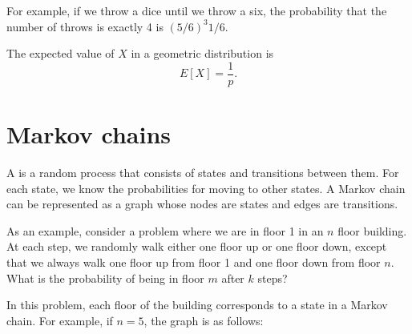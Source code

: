 For example, if we throw a dice until we throw a six,
the probability that the number of throws
is exactly 4 is $(5/6)^3 1/6$.

The expected value of $X$ in a geometric distribution is
\[E[X]=\frac{1}{p}.\]

\section{Markov chains}


A 
is a random process
that consists of states and transitions between them.
For each state, we know the probabilities
for moving to other states.
A Markov chain can be represented as a graph
whose nodes are states and edges are transitions.

As an example, consider a problem
where we are in floor 1 in an $n$ floor building.
At each step, we randomly walk either one floor
up or one floor down, except that we always
walk one floor up from floor 1 and one floor down
from floor $n$.
What is the probability of being in floor $m$
after $k$ steps?

In this problem, each floor of the building
corresponds to a state in a Markov chain.
For example, if $n=5$, the graph is as follows:

\begin{center}
\end{center}

